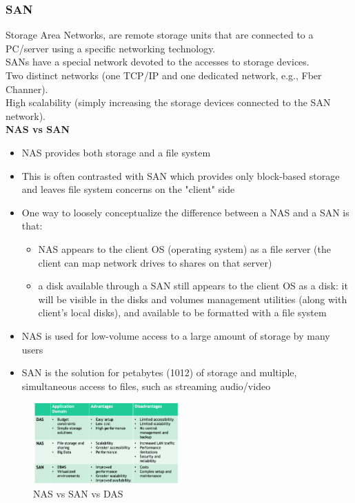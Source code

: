 \documentclass[10pt, oneside]{article}
\begin{document}
\subsubsection{SAN}
Storage Area Networks, are remote storage units that are connected to a PC/server using a specific networking technology.\\
SANs have a special network devoted to the accesses to storage devices.\\
Two distinct networks (one TCP/IP and one dedicated network, e.g., Fber Channer).\\
High scalability (simply increasing the storage devices connected to the SAN network).\\
\newline
{\bf NAS vs SAN}\\
\begin{itemize}
    \item NAS provides both storage and a file system
    \item This is often contrasted with SAN which provides only block-based storage and leaves file system concerns on the "client" side
    \item One way to loosely conceptualize the difference between a NAS and a SAN is that:
    \begin{itemize}
        \item NAS appears to the client OS (operating system) as a file server (the client can map network drives to shares on that server)
        \item a disk available through a SAN still appears to the client OS as a disk: it will be visible in the disks and volumes management utilities (along with client's local disks), and available to be formatted with a file system
    \end{itemize}
    \item NAS is used for low-volume access to a large amount of storage by many users
    \item SAN is the solution for petabytes (1012) of storage and multiple, simultaneous access to files, such as streaming audio/video
\end{itemize}

\begin{figure}[H]
    \begin{center}
    \includegraphics[width=0.5\textwidth]{img/img20.png}
    \caption{NAS vs SAN vs DAS}
    \label{fig:NAS,SAN,DAS}
    \end{center}
\end{figure}
\end{document}
